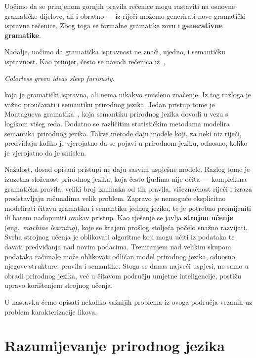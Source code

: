 \documentclass[a4paper,twoside,12pt]{memoir} %
\newcommand{\ti}[1]{\textit{#1\/}}
\newcommand{\tb}{\textbf}
\begin{document}
	Uočimo da se primjenom gornjih pravila rečenice mogu rastaviti na osnovne gramatičke dijelove, ali i obratno --- iz riječi možemo generirati nove gramatički ispravne rečenice. Zbog toga se formalne gramatike zovu i \tb{generativne gramatike}.

	Nadalje, uočimo da gramatička ispravnost ne znači, ujedno, i semantičku ispravnost. Kao primjer, često se navodi rečenica iz~\cite{chomsky},
	\begin{displayquote}
		\ti{Colorless green ideas sleep furiously.}
	\end{displayquote}
	koja je gramatički ispravna, ali nema nikakvo smisleno značenje. Iz tog razloga je važno proučavati i semantiku prirodnog jezika. Jedan pristup tome je Montagueva gramatika~\cite{montague1970universal}, koja semantiku prirodnog jezika dovodi u vezu s logikom višeg reda. Dodatno se različitim statističkim metodama modelira semantika prirodnog jezika. Takve metode daju modele koji, za neki niz riječi, predviđaju koliko je vjerojatno da se pojavi u prirodnom jeziku, odnosno, koliko je vjerojatno da je smislen.

	Nažalost, dosad opisani pristupi ne daju sasvim uspješne modele. Razlog tome je izuzetna složenost prirodnog jezika, koja često ljudima nije očita --- kompleksna gramatička pravila, veliki broj iznimaka od tih pravila, višeznačnost riječi i izraza predstavljaju računalima velik problem. Zapravo je nemoguće eksplicitno modelirati čitavu gramatiku i semantiku jednog jezika, te je potrebno promijeniti ili barem nadopuniti ovakav pristup. Kao rješenje se javlja \tb{strojno učenje} (eng.~\ti{machine learning}), koje se krajem prošlog stoljeća počelo snažno razvijati. Svrha strojnog učenja je oblikovati algoritme koji mogu učiti iz podataka te davati predviđanja nad novim podacima. Treniranjem nad velikim skupom podataka računalo može oblikovati odličan model prirodnog jezika, odnosno, njegove strukture, pravila i semantike. Stoga se danas najveći uspjesi, ne samo u obradi prirodnog jezika, već u čitavom području umjetne inteligencije, postižu upravo korištenjem strojnog učenja.

	U nastavku ćemo opisati nekoliko važnijih problema iz ovoga područja vezanih uz problem karakterizacije likova.


	\section{Razumijevanje prirodnog jezika}
\end{document}
